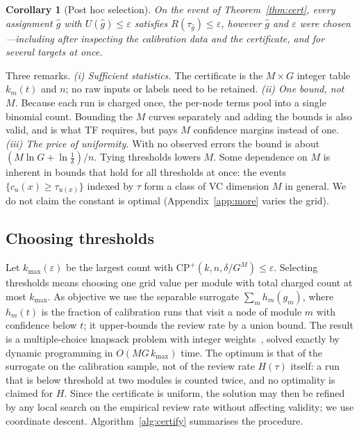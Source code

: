 \documentclass[11pt]{article}
\newtheorem{corollary}[theorem]{Corollary}
\theoremstyle{definition}
\theoremstyle{remark}
\newcommand{\CP}{\mathrm{CP}^{+}}
\newcommand{\eps}{\varepsilon}
\begin{document}
\begin{corollary}[Post hoc selection]\label{cor:posthoc}
On the event of Theorem~\ref{thm:cert}, every assignment $\hat g$ with $U(\hat g)\le\eps$
satisfies $R(\tau_{\hat g})\le\eps$, however $\hat g$ and $\eps$ were chosen---including after
inspecting the calibration data and the certificate, and for several targets at once.
\end{corollary}

Three remarks. \emph{(i) Sufficient statistics.} The certificate is the $M\times G$ integer
table $k_m(t)$ and $n$; no raw inputs or labels need to be retained. \emph{(ii) One bound, not
$M$.} Because each run is charged once, the per-node terms pool into a single binomial count.
Bounding the $M$ curves separately and adding the bounds is also valid, and is what TF
requires, but pays $M$ confidence margins instead of one. \emph{(iii) The price of
uniformity.} With no observed errors the bound is about $(M\ln G+\ln\frac1\delta)/n$. Tying
thresholds lowers $M$. Some dependence on $M$ is inherent in bounds that hold for all
thresholds at once: the events $\{c_u(x)\ge\tau_{u(x)}\}$ indexed by $\tau$ form a class of VC
dimension $M$ in general. We do not claim the constant is optimal
(Appendix~\ref{app:more} varies the grid).

\subsection{Choosing thresholds}

Let $k_{\max}(\eps)$ be the largest count with $\CP(k,n,\delta/G^M)\le\eps$. Selecting thresholds
means choosing one grid value per module with total charged count at most $k_{\max}$. As
objective we use the separable surrogate $\sum_m h_m(g_m)$, where $h_m(t)$ is the fraction of
calibration runs that visit a node of module $m$ with confidence below $t$; it upper-bounds the
review rate by a union bound. The result is a multiple-choice knapsack problem with integer
weights~\citep{kellerer2004}, solved exactly by dynamic programming in $O(MG\,k_{\max})$ time.
The optimum is that of the surrogate on the calibration sample, not of the review rate
$H(\tau)$ itself: a run that is below threshold at two modules is counted twice, and no
optimality is claimed for $H$. Since the certificate is uniform, the solution may then be
refined by any local search on the empirical review rate without affecting validity; we use
coordinate descent.
Algorithm~\ref{alg:certify} summarises the procedure.
\end{document}
